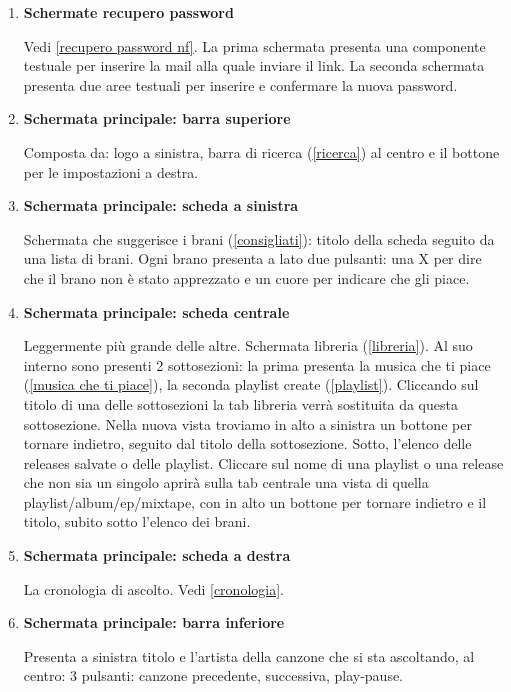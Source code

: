 \documentclass[a4paper,12pt]{article}
\begin{document}
\begin{enumerate}[label=\textbf{FE\arabic*}\;, ref=\textbf{FE\arabic*}]
    \item \label{schermata recupero password} \textbf{Schermate recupero password}
    
    Vedi \ref{recupero password nf}. La prima schermata presenta una componente testuale per inserire la mail alla quale inviare il link. La seconda schermata presenta due aree testuali per inserire e confermare la nuova password.
    \item \label{barra superiore} \textbf{Schermata principale: barra superiore}
    
    Composta da: logo a sinistra, barra di ricerca (\ref{ricerca}) al centro e il bottone per le impostazioni a destra. 
    \item \label{scheda a sinistra} \textbf{Schermata principale: scheda a sinistra}
    
    Schermata che suggerisce i brani (\ref{consigliati}): titolo della scheda seguito da una lista di brani. Ogni brano presenta a lato due pulsanti: una X per dire che il brano non è stato apprezzato e un cuore per indicare che gli piace.
    \item \label{scheda centrale} \textbf{Schermata principale: scheda centrale}
    
    Leggermente più grande delle altre. Schermata libreria (\ref{libreria}). Al suo interno sono presenti 2 sottosezioni: la prima presenta la musica che ti piace (\ref{musica che ti piace}), la seconda playlist create (\ref{playlist}). Cliccando sul titolo di una delle sottosezioni la tab libreria verrà sostituita da questa sottosezione. Nella nuova vista troviamo in alto a sinistra un bottone per tornare indietro, seguito dal titolo della sottosezione. Sotto, l’elenco delle releases salvate o delle playlist. Cliccare sul nome di una playlist o una release che non sia un singolo aprirà sulla tab centrale una vista di quella playlist/album/ep/mixtape, con in alto un bottone per tornare indietro e il titolo, subito sotto l'elenco dei brani.
    \item \label{scheda a destra} \textbf{Schermata principale: scheda a destra}
    
    La cronologia di ascolto. Vedi \ref{cronologia}.
    \item \label{barra inferiore} \textbf{Schermata principale: barra inferiore}
    
    Presenta a sinistra titolo e l’artista della canzone che si sta ascoltando, al centro: 3 pulsanti: canzone precedente, successiva, play-pause.


\end{enumerate}
\end{document}
